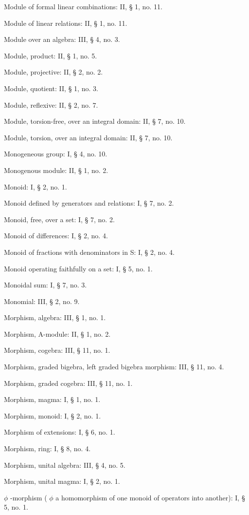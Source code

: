Module of formal linear combinations: II, § 1, no. 11.

Module of linear relations: II, § 1, no. 11.

Module over an algebra: III, § 4, no. 3.

Module, product: II, § 1, no. 5.

Module, projective: II, § 2, no. 2.

Module, quotient: II, § 1, no. 3.

Module, reflexive: II, § 2, no. 7.

Module, torsion-free, over an integral domain: II, § 7, no. 10.

Module, torsion, over an integral domain: II, § 7, no. 10.

Monogeneous group: I, § 4, no. 10.

Monogenous module: II, § 1, no. 2.

Monoid: I, § 2, no. 1.

Monoid defined by generators and relations: I, § 7, no. 2.

Monoid, free, over a set: I, § 7, no. 2.

Monoid of differences: I, § 2, no. 4.

Monoid of fractions with denominators in S: I, § 2, no. 4.

Monoid operating faithfully on a set: I, § 5, no. 1.

Monoidal sum: I, § 7, no. 3.

Monomial: III, § 2, no. 9.

Morphism, algebra: III, § 1, no. 1.

Morphism, A-module: II, § 1, no. 2.

Morphism, cogebra: III, § 11, no. 1.

Morphism, graded bigebra, left graded bigebra morphism: III, § 11, no. 4.

Morphism, graded cogebra: III, § 11, no. 1.

Morphism, magma: I, § 1, no. 1.

Morphism, monoid: I, § 2, no. 1.

Morphism of extensions: I, § 6, no. 1.

Morphism, ring: I, § 8, no. 4.

Morphism, unital algebra: III, § 4, no. 5.

Morphism, unital magma: I, § 2, no. 1.

\(\phi\) -morphism ( \(\phi\) a homomorphism of one monoid of operators into another): I, § 5, no. 1.

